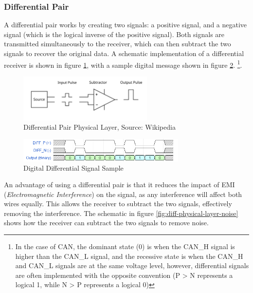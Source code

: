 \documentclass[main.tex]{subfiles}
\begin{document}
\subsubsection{Differential Pair} 
A differential pair works by creating two signals: a positive signal, and a negative signal (which is the logical inverse of the positive signal). Both signals are transmitted simultaneously to the receiver, which can then subtract the two signals to recover the original data. A schematic implementation of a differential receiver is shown in figure \ref{fig:diff-physical-layer}, with a sample digital message shown in figure \ref{fig:diff-digital-sample}. \footnote{In the case of CAN, the dominant state (0) is when the CAN\_H signal is higher than the CAN\_L signal, and the recessive state is when the CAN\_H and CAN\_L signals are at the same voltage level, however, differential signals are often implemented with the opposite convention (P > N represents a logical 1, while N > P represents a logical 0)}.
\begin{figure}[H]
    \centering
    \includegraphics[width=0.6\textwidth]{images/wikipedia_diff_signal.png}
    \caption{Differential Pair Physical Layer, Source: Wikipedia \cite{wikipedia_differential_signalling}}
    \label{fig:diff-physical-layer}
\end{figure}
\begin{figure}[H]
    \centering
    \includegraphics[width=0.75\textwidth]{images/diff_digital_signal.png}
    \caption{Digital Differential Signal Sample}
    \label{fig:diff-digital-sample}
\end{figure}

\noindent An advantage of using a differential pair is that it reduces the impact of EMI (\textit{Electromagnetic Interference}) on the signal, as any interference will affect both wires equally. This allows the receiver to subtract the two signals, effectively removing the interference. The schematic in figure \ref{fig:diff-physical-layer-noise} shows how the receiver can subtract the two signals to remove noise.
\end{document}
